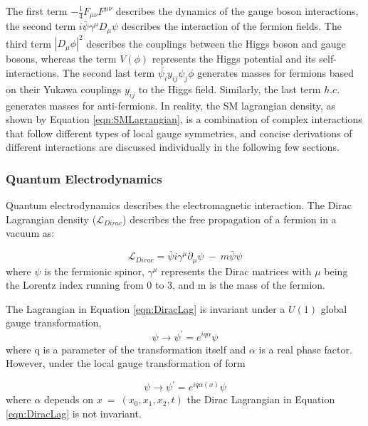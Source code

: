 The first term $-\frac{1}{4}F_{\mu\nu}F^{\mu\nu}$ describes the dynamics of the gauge boson interactions, the second term $i\bar{\psi}\gamma^{\mu}D_{\mu}\psi$ describes the interaction of the fermion fields. The third term $|D_{\mu}\phi|^{2}$ describes the couplings between the Higgs boson and gauge bosons, whereas the term $V(\phi)$ represents the Higgs potential and its self-interactions. The second last term $\bar{\psi_{i}}y_{ij}\psi_{j}\phi$ generates masses for fermions based on their Yukawa couplings $y_{ij}$ to the Higgs field. Similarly, the last term $h.c.$ generates masses for anti-fermions. In reality, the SM lagrangian density, as shown by Equation \ref{eqn:SMLagrangian}, is a combination of complex interactions that follow different types of local gauge symmetries, and concise derivations of different interactions are discussed individually in the following few sections.
 
\subsubsection{Quantum Electrodynamics}
\label{subsubsec:QED}
Quantum electrodynamics describes the electromagnetic interaction. The Dirac Lagrangian density ($\mathcal{L}_{Dirac}$) describes the free propagation of a fermion in a vacuum as:  

\begin{equation}
\mathcal{L}_{Dirac} = \bar{\psi} i \gamma^{\mu} \partial_{\mu} \psi ~-~ m\bar{\psi}\psi
\label{eqn:DiracLag}
\end{equation}
where $\psi$ is the fermionic spinor, $\gamma^{\mu}$ represents the Dirac matrices with $\mu$ being the Lorentz index running from $0$ to $3$, and m is the mass of the fermion. 

The Lagrangian in Equation \ref{eqn:DiracLag} is invariant under a $U(1)$ global gauge transformation, 
\begin{equation}
\psi\rightarrow \psi^{'}=e^{iq\alpha}\psi 
\label{eqn:QEDGlobalTrans}
\end{equation}
where q is a parameter of the transformation itself and $\alpha$ is a real phase factor. However, under the local gauge transformation of form 

\begin{equation}
\psi\rightarrow \psi^{'}=e^{iq\alpha(x)}\psi
\label{eqn:QEDLocalTrans}
\end{equation}
where $\alpha$ depends on $x~=~(x_{0},x_{1},x_{2},t)$ the Dirac Lagrangian in Equation \ref{eqn:DiracLag} is not invariant. 

